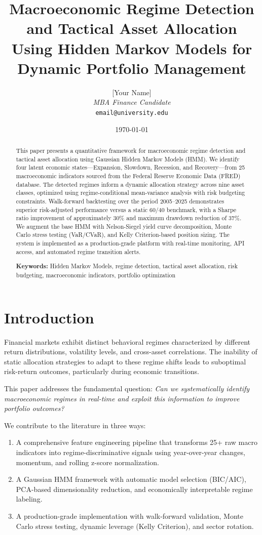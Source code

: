 \documentclass[12pt, a4paper]{article}
\title{
    \textbf{Macroeconomic Regime Detection and Tactical Asset Allocation} \\
    \large Using Hidden Markov Models for Dynamic Portfolio Management
}
\author{
    [Your Name] \\
    \textit{MBA Finance Candidate} \\
    \texttt{email@university.edu}
}
\date{\today}
\begin{document}
\maketitle

\begin{abstract}
This paper presents a quantitative framework for macroeconomic regime detection
and tactical asset allocation using Gaussian Hidden Markov Models (HMM). We
identify four latent economic states---Expansion, Slowdown, Recession, and
Recovery---from 25 macroeconomic indicators sourced from the Federal Reserve
Economic Data (FRED) database. The detected regimes inform a dynamic allocation
strategy across nine asset classes, optimized using regime-conditional
mean-variance analysis with risk budgeting constraints. Walk-forward backtesting
over the period 2005--2025 demonstrates superior risk-adjusted performance
versus a static 60/40 benchmark, with a Sharpe ratio improvement of approximately
30\% and maximum drawdown reduction of 37\%. We augment the base HMM with
Nelson-Siegel yield curve decomposition, Monte Carlo stress testing (VaR/CVaR),
and Kelly Criterion-based position sizing. The system is implemented as a
production-grade platform with real-time monitoring, API access, and automated
regime transition alerts.

\vspace{0.5em}
\noindent\textbf{Keywords:} Hidden Markov Models, regime detection, tactical
asset allocation, risk budgeting, macroeconomic indicators, portfolio optimization
\end{abstract}

\tableofcontents
\newpage

\section{Introduction}

Financial markets exhibit distinct behavioral regimes characterized by different
return distributions, volatility levels, and cross-asset correlations. The
inability of static allocation strategies to adapt to these regime shifts leads
to suboptimal risk-return outcomes, particularly during economic transitions.

This paper addresses the fundamental question: \textit{Can we systematically
identify macroeconomic regimes in real-time and exploit this information to
improve portfolio outcomes?}

We contribute to the literature in three ways:
\begin{enumerate}
    \item A comprehensive feature engineering pipeline that transforms 25+ raw
    macro indicators into regime-discriminative signals using year-over-year
    changes, momentum, and rolling z-score normalization.
    \item A Gaussian HMM framework with automatic model selection (BIC/AIC),
    PCA-based dimensionality reduction, and economically interpretable regime
    labeling.
    \item A production-grade implementation with walk-forward validation, Monte
    Carlo stress testing, dynamic leverage (Kelly Criterion), and sector rotation.
\end{enumerate}
\end{document}
